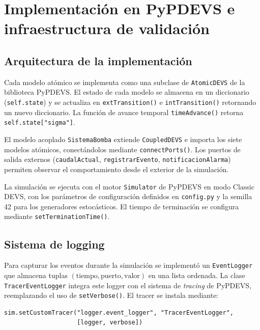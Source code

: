 \documentclass[12pt,a4paper]{article}
\begin{document}
\section{Implementación en PyPDEVS e infraestructura de validación}

\subsection{Arquitectura de la implementación}

Cada modelo atómico se implementa como una subclase de
\texttt{AtomicDEVS} de la biblioteca PyPDEVS.  El estado de cada modelo
se almacena en un diccionario (\texttt{self.state}) y se actualiza en
\texttt{extTransition()} e \texttt{intTransition()} retornando un nuevo
diccionario.  La función de avance temporal \texttt{timeAdvance()}
retorna \texttt{self.state["sigma"]}.

El modelo acoplado \texttt{SistemaBomba} extiende \texttt{CoupledDEVS}
e importa los siete modelos atómicos, conectándolos mediante
\texttt{connectPorts()}.  Los puertos de salida externos
(\texttt{caudalActual}, \texttt{registrarEvento},
\texttt{notificacionAlarma}) permiten observar el comportamiento desde
el exterior de la simulación.

La simulación se ejecuta con el motor \texttt{Simulator} de PyPDEVS en
modo Classic DEVS, con los parámetros de configuración definidos en
\texttt{config.py} y la semilla 42 para los generadores estocásticos.
El tiempo de terminación se configura mediante
\texttt{setTerminationTime()}.

\subsection{Sistema de logging}

Para capturar los eventos durante la simulación se implementó un
\texttt{EventLogger} que almacena tuplas
$(\text{tiempo}, \text{puerto}, \text{valor})$ en una lista
ordenada.  La clase \texttt{TracerEventLogger} integra este logger
con el sistema de \textit{tracing} de PyPDEVS, reemplazando el uso de
\texttt{setVerbose()}.  El tracer se instala mediante:

\begin{lstlisting}
sim.setCustomTracer("logger.event_logger", "TracerEventLogger",
                    [logger, verbose])
\end{lstlisting}
\end{document}
